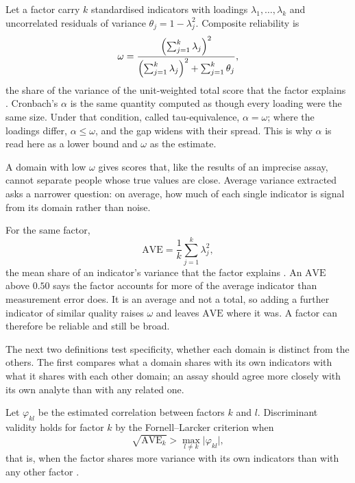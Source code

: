 \begin{definition}
\label{def:meas:omega}
Let a factor carry $k$ standardised indicators with loadings
$\lambda_1,\dots,\lambda_k$ and uncorrelated residuals of variance
$\theta_j=1-\lambda_j^{2}$. Composite reliability is
\begin{equation}
  \omega=\frac{\Bigl(\sum_{j=1}^{k}\lambda_j\Bigr)^{2}}
              {\Bigl(\sum_{j=1}^{k}\lambda_j\Bigr)^{2}+\sum_{j=1}^{k}\theta_j},
  \label{eq:omega}
\end{equation}
the share of the variance of the unit-weighted total score that the factor
explains \citep{raykov_1997}. Cronbach's $\alpha$ is the same quantity computed
as though every loading were the same size. Under that condition, called
tau-equivalence, $\alpha=\omega$; where the loadings differ, $\alpha\le\omega$,
and the gap widens with their spread. This is why $\alpha$ is read here as a
lower bound and $\omega$ as the estimate.
\end{definition}

A domain with low $\omega$ gives scores that, like the results of an imprecise assay, cannot separate people whose true values are close. Average variance extracted asks a narrower question: on average, how much of each single indicator is signal from its domain rather than noise.

\begin{definition}
\label{def:meas:ave}
For the same factor,
\begin{equation}
  \mathrm{AVE}=\frac{1}{k}\sum_{j=1}^{k}\lambda_j^{2},
  \label{eq:ave}
\end{equation}
the mean share of an indicator's variance that the factor explains
\citep{fornell_1981}. An $\mathrm{AVE}$ above $0.50$ says the factor accounts
for more of the average indicator than measurement error does. It is an
average and not a total, so adding a further indicator of similar quality
raises $\omega$ and leaves $\mathrm{AVE}$ where it was. A factor can therefore
be reliable and still be broad.
\end{definition}

The next two definitions test specificity, whether each domain is distinct from the others. The first compares what a domain shares with its own indicators with what it shares with each other domain; an assay should agree more closely with its own analyte than with any related one.

\begin{definition}
\label{def:meas:fl}
Let $\varphi_{kl}$ be the estimated correlation between factors $k$ and $l$.
Discriminant validity holds for factor $k$ by the Fornell--Larcker criterion
when
\begin{equation}
  \sqrt{\mathrm{AVE}_k}>\max_{l\neq k}\lvert\varphi_{kl}\rvert,
  \label{eq:fornell}
\end{equation}
that is, when the factor shares more variance with its own indicators than
with any other factor \citep{fornell_1981}.
\end{definition}

